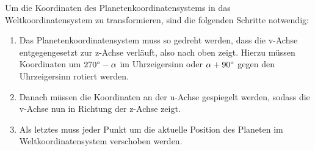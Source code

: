 \documentclass[a4paper,10pt,DIV=14]{scrartcl}
\begin{document}
Um die Koordinaten des Planetenkoordinatensystems in das Weltkoordinatensystem zu transformieren, sind die folgenden Schritte notwendig:
\begin{enumerate}[itemsep=0pt]
\item Das Planetenkoordinatensystem muss so gedreht werden, dass die v-Achse entgegengesetzt zur z-Achse verläuft, also nach oben zeigt. Hierzu müssen Koordinaten um $270\degree - \alpha$ im Uhrzeigersinn oder $\alpha + 90\degree$ gegen den Uhrzeigersinn rotiert werden.
\item Danach müssen die Koordinaten an der u-Achse gespiegelt werden, sodass die v-Achse nun in Richtung der z-Achse zeigt.
\item Als letztes muss jeder Punkt um die aktuelle Position des Planeten im Weltkoordinatensystem verschoben werden.
\end{enumerate}
\end{document}
